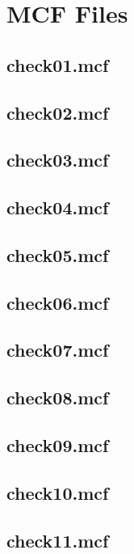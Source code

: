 \section{MCF Files}

\label{sec:mcf}

\subsection{check01.mcf}


\subsection{check02.mcf}


\subsection{check03.mcf}


\subsection{check04.mcf}


\subsection{check05.mcf}


\subsection{check06.mcf}


\subsection{check07.mcf}


\subsection{check08.mcf}


\subsection{check09.mcf}


\subsection{check10.mcf}


\subsection{check11.mcf}

